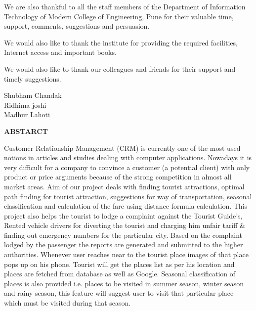\documentclass[12pt,a4paper]{article}
\begin{document}
We are also thankful to all the staff members of the Department of Information Technology of Modern College of Engineering, Pune for their valuable time, support, comments, suggestions and persuasion.

We would also like to thank the institute for providing the required facilities, Internet access and important books.
  
We would also like to thank our colleagues and friends for their support and timely suggestions.

\begin{flushright}
\hspace{3.5in} 
Shubham Chandak\\
Ridhima joshi\\	
Madhur Lahoti\\
\end{flushright}


\newpage
{}
\pagestyle{plain}           %
\begin{center}
\bf ABSTARCT
\end{center}
\hspace{0.7cm}Customer Relationship Management (CRM) is currently one of the most used notions in articles and studies dealing with computer applications. Nowadays it is very difficult for a company to convince a customer (a potential client) with only product or price arguments because of the strong competition in almost all market areas. Aim of our project deals with finding tourist attractions, optimal path finding for tourist attraction, suggestions for way of transportation, seasonal classification and calculation of the fare using distance formula calculation. This project also helps the tourist to lodge a complaint against the Tourist Guide’s, Rented vehicle drivers for diverting the tourist and charging him unfair tariff & finding out emergency numbers for the particular city. Based on the complaint lodged by the passenger the reports are generated and submitted to the higher authorities. Whenever user reaches near to the tourist place images of that place pops up on his phone. Tourist will get the places list as per his location and places are fetched from database as well as Google. Seasonal classification of places is also provided i.e. places to be visited in summer season, winter season and rainy season, this feature will suggest user to visit that particular place which must be visited during that season.
\end{document}

